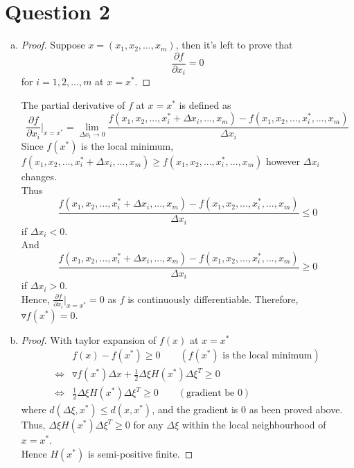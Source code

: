 \documentclass[paper=a4, fontsize=11pt]{scrartcl} %
\numberwithin{equation}{section} %
\numberwithin{figure}{section} %
\numberwithin{table}{section} %
\begin{document}
\section{Question 2}
	\begin{enumerate}[(a)]
		\item 
			\begin{proof}
				Suppose $x = (x_1, x_2, ... , x_m)$, then it's left to prove that
				\begin{equation}
					\frac{\partial f}{\partial x_i} = 0
				\end{equation}
				for $i=1,2, ... , m$ at $x=x^*$.
			\end{proof}
			The partial derivative of $f$ at $x=x^*$ is defined as
			\begin{equation}
				\frac{\partial f}{\partial x_i}\Big|_{x=x^*} = 
				\lim\limits_{\Delta x_i \rightarrow 0}\frac{f(x_1, x_2, ... ,x_i^* + \Delta x_i, ... , x_m) - f(x_1, x_2, ... ,x_i^*, ... , x_m)}{\Delta x_i}
			\end{equation}
			Since $f(x^*)$ is the local minimum, $f(x_1, x_2, ... ,x_i^* + \Delta x_i, ... , x_m) \geq f(x_1, x_2, ... ,x_i^*, ... , x_m)$ however $\Delta x_i$ changes.\\
			Thus
			\begin{equation}
				\frac{f(x_1, x_2, ... ,x_i^* + \Delta x_i, ... , x_m) - f(x_1, x_2, ... ,x_i^*, ... , x_m)}{\Delta x_i} \leq 0
			\end{equation} 
			if $\Delta x_i < 0$.\\
			And
			\begin{equation}
				\frac{f(x_1, x_2, ... ,x_i^* + \Delta x_i, ... , x_m) - f(x_1, x_2, ... ,x_i^*, ... , x_m)}{\Delta x_i} \geq 0
			\end{equation}  
			if $\Delta x_i > 0$.\\
			Hence, $\frac{\partial f}{\partial x_i}\Big|_{x=x^*} = 0$ as $f$ is continuously differentiable.
			Therefore, $\triangledown f(x^*) =0$.
		\item 
			\begin{proof}
				With taylor expansion of $f(x)$ at $x=x^*$
				\begin{equation}
					\begin{aligned}
						  &f(x) - f(x^*) \geq 0 \quad \quad (\text{$f(x^*)$ is the local minimum})\\
		  \Leftrightarrow &\triangledown f(x^*) \Delta x + \frac{1}{2} \Delta \xi H(x^*) \Delta \xi ^T \geq 0\\
		  \Leftrightarrow &\frac{1}{2} \Delta \xi H(x^*) \Delta \xi ^T \geq 0 \quad \quad (\text{gradient be 0})
					\end{aligned}
				\end{equation}
				where $d(\Delta \xi, x^*) \leq d(x, x^*)$, and the gradient is $0$ as been proved above.
				Thus, $ \Delta \xi H(x^*) \Delta \xi ^T \geq 0$ for any $\Delta \xi$ within the local neighbourhood of $x=x^*$.\\
				Hence $H(x^*)$ is semi-positive finite.
				

\end{proof}
\end{enumerate}
\end{document}
